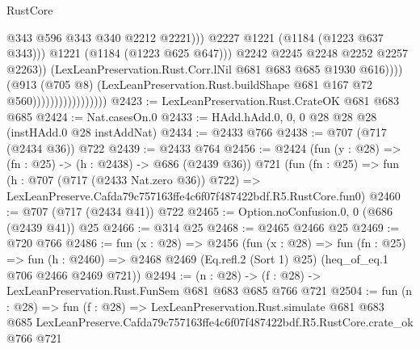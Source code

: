 \begin{lexlean}{RustCore}
\begin{coremodule}
                                                      @343
                                                      @596
                                                      @343
                                                      @340
                                                      @2212
                                                      @2221)))
                                                @2227
                                                @1221
                                                (@1184 (@1223 @637 @343)))
                                              @1221
                                              (@1184 (@1223 @625 @647)))
                                            @2242
                                            @2245
                                            @2248
                                            @2252
                                            @2257
                                            @2263))
                                        (LexLeanPreservation.Rust.Corr.lNil
                                          @681
                                          @683
                                          @685
                                          @1930
                                          @616))))
                                  (@913
                                    (@705 @8)
                                    (LexLeanPreservation.Rust.buildShape
                                      @681
                                      @167
                                      @72
                                      @560)))))))))))))))))
@2423 := LexLeanPreservation.Rust.CrateOK @681 @683 @685
@2424 := Nat.casesOn.{0}
@2433 := HAdd.hAdd.{0, 0, 0} @28 @28 @28 (instHAdd.{0} @28 instAddNat)
@2434 := @2433 @766
@2438 := @707 (@717 (@2434 @36)) @722
@2439 := @2433 @764
@2456 := @2424
    (fun (y : @28) => (fn : @25) -> (h : @2438) -> @686 (@2439 @36))
    @721
    (fun (fn : @25) =>
    fun (h : @707 (@717 (@2433 Nat.zero @36)) @722) =>
    LexLeanPreserve.Cafda79c757163ffe4c6f07f487422bdf.R5.RustCore.fun0)
@2460 := @707 (@717 (@2434 @41)) @722
@2465 := Option.noConfusion.{0, 0} (@686 (@2439 @41)) @25
@2466 := @314 @25
@2468 := @2465 @2466 @25
@2469 := @720 @766
@2486 := fun (x : @28) =>
  @2456
    (fun (x : @28) =>
    fun (fn : @25) =>
    fun (h : @2460) => @2468 @2469 (Eq.refl.{2} (Sort 1) @25) (heq_of_eq.{1} @706 @2466 @2469 @721))
@2494 := (n : @28) -> (f : @28) -> LexLeanPreservation.Rust.FunSem @681 @683 @685 @766 @721
@2504 := fun (n : @28) =>
  fun (f : @28) =>
  LexLeanPreservation.Rust.simulate
    @681
    @683
    @685
    LexLeanPreserve.Cafda79c757163ffe4c6f07f487422bdf.R5.RustCore.crate_ok
    @766
    @721
\end{coremodule}
\end{lexlean}
